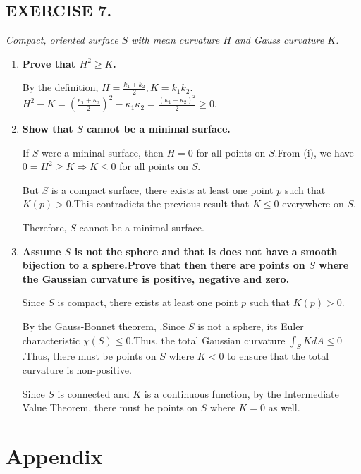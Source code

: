 \documentclass[a4paper,12pt]{article}
\newcommand{\ex}[1]{\textcolor{examplecolor}{\bfseries\boldmath{#1}}}
\newcommand{\sol}[1]{\textcolor{examplecolor}{#1}}
\begin{document}
\subsection{EXERCISE 7.}
\textit{Compact, oriented surface $S$ with mean curvature $H$ and Gauss curvature $K$.}
\begin{enumerate}[label=(\roman*)]
    \item \textbf{Prove that $H^{2} \geq K$.}\par
    By the definition, \sol{$H = \frac{k_1+k_2}{2}, K = k_1 k_2$}.$H^2-K=\left(\frac{\kappa_1+\kappa_2}{2}\right)^2-\kappa_1\kappa_2=\frac{(\kappa_1-\kappa_2)^2}{2}\geq 0$.
    \item \textbf{Show that $S$ cannot be a minimal surface.}\par
    If $S$ were a mininal surface, then $H=0$ for all points on $S$.From (i), we have $0=H^2\geq K\Rightarrow K\leq 0$ for all points on $S$.\par
    But $S$ is a compact surface, there exists at least one point $p$ such that $K(p)>0$.This contradicts the previous result that $K\leq 0$ everywhere on $S$.\par
    Therefore, $S$ cannot be a minimal surface.
    \item \textbf{Assume $S$ is not the sphere and that is does not have a smooth bijection to a sphere.Prove that then there are points on $S$ where the Gaussian curvature is positive, negative and zero.}\par
    Since $S$ is compact, there exists at least one point $p$ such that $K(p)>0$.\par
    By the Gauss-Bonnet theorem, \ex{$\int_S K dA = 2\pi \chi(S)$}.Since $S$ is not a sphere, its Euler characteristic $\chi(S) \leq 0$.Thus, the total Gaussian curvature $\int_S K dA \leq 0$.Thus, there must be points on $S$ where $K<0$ to ensure that the total curvature is non-positive.\par
    Since $S$ is connected and $K$ is a continuous function, by the Intermediate Value Theorem, there must be points on $S$ where $K=0$ as well.
\end{enumerate}

\section{Appendix}
\end{document}
